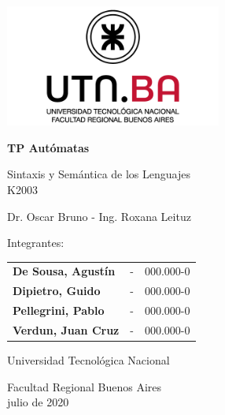 \documentclass[a4paper, 12pt]{article}
\begin{document}
\begin{titlepage}
    \begin{center}
        \vspace*{1cm}
        
        \includegraphics[height=4cm]{images/utn.png}
        
        \vspace{2cm}
        
        \Huge
        \textbf{TP Autómatas}
            
        \vspace{0.5cm}
        \LARGE
        Sintaxis y Semántica de los Lenguajes\\
        K2003
        
        \vspace{1cm}
        
        \large
        Dr. Oscar Bruno - Ing. Roxana Leituz
            
        \vspace{3cm}
        
        \LARGE
        Integrantes: \\
        
        \vspace{0.5cm}
        
        \large
        \begin{tabular}{lcr}
        \textbf{De Sousa, Agustín} &-& 000.000-0\\
        \textbf{Dipietro, Guido} &-& 000.000-0\\
        \textbf{Pellegrini, Pablo} &-& 000.000-0\\
        \textbf{Verdun, Juan Cruz} &-& 000.000-0
        \end{tabular}
            
        \vfill
            
        Universidad Tecnológica Nacional
            
        \Large
        Facultad Regional Buenos Aires\\
        julio de 2020
            
    \end{center}
\end{titlepage}
\end{document}
